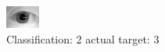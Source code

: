 \begin{figure}[h!]
\begin{center}
\includegraphics[width=0.60\columnwidth]{figures/ID1068_class_2_target_3.png}
\end{center}
\caption{ Classification: 2 actual target: 3}
\label{fig:ID1068_class_2_target_3}
\end{figure}
